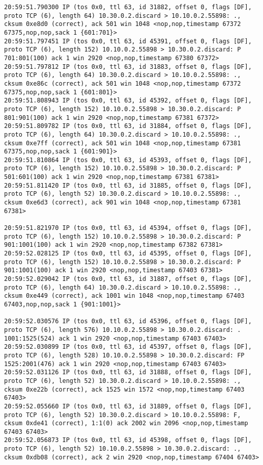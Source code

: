 \documentclass[a4paper,12pt]{article}
\begin{document}
\begin{lstlisting}
20:59:51.790300 IP (tos 0x0, ttl 63, id 31882, offset 0, flags [DF], proto TCP (6), length 64) 10.30.0.2.discard > 10.10.0.2.55898: ., cksum 0xe8d0 (correct), ack 501 win 1048 <nop,nop,timestamp 67372 67375,nop,nop,sack 1 {601:701}>
20:59:51.797451 IP (tos 0x0, ttl 63, id 45391, offset 0, flags [DF], proto TCP (6), length 152) 10.10.0.2.55898 > 10.30.0.2.discard: P 701:801(100) ack 1 win 2920 <nop,nop,timestamp 67380 67372>
20:59:51.797812 IP (tos 0x0, ttl 63, id 31883, offset 0, flags [DF], proto TCP (6), length 64) 10.30.0.2.discard > 10.10.0.2.55898: ., cksum 0xe86c (correct), ack 501 win 1048 <nop,nop,timestamp 67372 67375,nop,nop,sack 1 {601:801}>
20:59:51.808943 IP (tos 0x0, ttl 63, id 45392, offset 0, flags [DF], proto TCP (6), length 152) 10.10.0.2.55898 > 10.30.0.2.discard: P 801:901(100) ack 1 win 2920 <nop,nop,timestamp 67381 67372>
20:59:51.809782 IP (tos 0x0, ttl 63, id 31884, offset 0, flags [DF], proto TCP (6), length 64) 10.30.0.2.discard > 10.10.0.2.55898: ., cksum 0xe7ff (correct), ack 501 win 1048 <nop,nop,timestamp 67381 67375,nop,nop,sack 1 {601:901}>
20:59:51.810864 IP (tos 0x0, ttl 63, id 45393, offset 0, flags [DF], proto TCP (6), length 152) 10.10.0.2.55898 > 10.30.0.2.discard: P 501:601(100) ack 1 win 2920 <nop,nop,timestamp 67381 67381>
20:59:51.811420 IP (tos 0x0, ttl 63, id 31885, offset 0, flags [DF], proto TCP (6), length 52) 10.30.0.2.discard > 10.10.0.2.55898: ., cksum 0xe6d3 (correct), ack 901 win 1048 <nop,nop,timestamp 67381 67381>

20:59:51.821970 IP (tos 0x0, ttl 63, id 45394, offset 0, flags [DF], proto TCP (6), length 152) 10.10.0.2.55898 > 10.30.0.2.discard: P 901:1001(100) ack 1 win 2920 <nop,nop,timestamp 67382 67381>
20:59:52.028125 IP (tos 0x0, ttl 63, id 45395, offset 0, flags [DF], proto TCP (6), length 152) 10.10.0.2.55898 > 10.30.0.2.discard: P 901:1001(100) ack 1 win 2920 <nop,nop,timestamp 67403 67381>
20:59:52.029042 IP (tos 0x0, ttl 63, id 31887, offset 0, flags [DF], proto TCP (6), length 64) 10.30.0.2.discard > 10.10.0.2.55898: ., cksum 0xe449 (correct), ack 1001 win 1048 <nop,nop,timestamp 67403 67403,nop,nop,sack 1 {901:1001}>

20:59:52.030576 IP (tos 0x0, ttl 63, id 45396, offset 0, flags [DF], proto TCP (6), length 576) 10.10.0.2.55898 > 10.30.0.2.discard: . 1001:1525(524) ack 1 win 2920 <nop,nop,timestamp 67403 67403>
20:59:52.030899 IP (tos 0x0, ttl 63, id 45397, offset 0, flags [DF], proto TCP (6), length 528) 10.10.0.2.55898 > 10.30.0.2.discard: FP 1525:2001(476) ack 1 win 2920 <nop,nop,timestamp 67403 67403>
20:59:52.031126 IP (tos 0x0, ttl 63, id 31888, offset 0, flags [DF], proto TCP (6), length 52) 10.30.0.2.discard > 10.10.0.2.55898: ., cksum 0xe22b (correct), ack 1525 win 1572 <nop,nop,timestamp 67403 67403>
20:59:52.055660 IP (tos 0x0, ttl 63, id 31889, offset 0, flags [DF], proto TCP (6), length 52) 10.30.0.2.discard > 10.10.0.2.55898: F, cksum 0xde41 (correct), 1:1(0) ack 2002 win 2096 <nop,nop,timestamp 67403 67403>
20:59:52.056873 IP (tos 0x0, ttl 63, id 45398, offset 0, flags [DF], proto TCP (6), length 52) 10.10.0.2.55898 > 10.30.0.2.discard: ., cksum 0xdb08 (correct), ack 2 win 2920 <nop,nop,timestamp 67404 67403>

\end{lstlisting}
\end{document}

